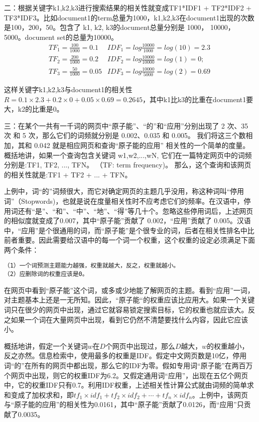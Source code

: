\par 二：根据关键字k1,k2,k3进行搜索结果的相关性就变成TF1*IDF1 + TF2*IDF2 + TF3*IDF3。比如document1的term总量为1000，k1,k2,k3在document1出现的次数是100，200，50。包含了 k1, k2, k3的document总量分别是 1000， 10000，5000。document set的总量为10000。 
\begin{eqnarray*}
TF_1 = \frac{100}{1000} = 0.1 & IDF_1 = log\frac{10000}{1000} = log(10) = 2.3 \\
TF_2 = \frac{200}{1000} = 0.2 & IDF_2 = log\frac{10000}{10000} = log(1) = 0; \\
TF_3 = \frac{50}{1000} = 0.05 & IDF_3 = log\frac{10000}{5000} = log(2) = 0.69
\end{eqnarray*}
\par 这样关键字k1,k2,k3与document1的相关性$R=0.1\times 2.3 + 0.2\times 0 + 0.05\times 0.69 = 0.2645$，其中k1比k3的比重在document1要大，k2的比重是0。
\par 三：在某个一共有一千词的网页中“原子能”、“的”和“应用”分别出现了 2 次、35 次 和 5 次，那么它们的词频就分别是 0.002、0.035 和 0.005。 我们将这三个数相加，其和 0.042 就是相应网页和查询“原子能的应用” 相关性的一个简单的度量。概括地讲，如果一个查询包含关键词 w1,w2,...,wN, 它们在一篇特定网页中的词频分别是:TF1, TF2, ..., TFN。 （TF: term frequency)。 那么，这个查询和该网页的相关性就是:TF1 + TF2 + ... + TFN。
\par 上例中，词“的”词频很大，而它对确定网页的主题几乎没用，称这种词叫“停用词”（Stopwords)，也就是说在度量相关性时不应考虑它们的频率。在汉语中，停用词还有“是”、“和”、“中”、“地”、“得”等几十个。忽略这些停用词后，上述网页的相似度就变成了0.007，其中“原子能”贡献了 0.002，“应用”贡献了 0.005。汉语中，“应用”是个很通用的词，而“原子能”是个很专业的词，后者在相关性排名中比前者重要。因此需要给汉语中的每一个词一个权重，这个权重的设定必须满足下面两个条件：
\begin{verbatim}
（1）一个词预测主题能力越强，权重就越大，反之，权重就越小。
（2）应删除词的权重应该是0。
\end{verbatim}
\par 在网页中看到“原子能”这个词，或多或少地能了解网页的主题。看到“应用”一词，对主题基本上还是一无所知。因此，“原子能“的权重应该比应用大。如果一个关键词只在很少的网页中出现，通过它就容易锁定搜索目标，它的权重也就应该大。反之如果一个词在大量网页中出现，看到它仍然不清楚要找什么内容，因此它应该小。
\par 概括地讲，假定一个关键词$w$在$D$个网页中出现过，那么$D$越大，$w$的权重越小，反之亦然。信息检索中，使用最多的权重是IDF。假定中文网页数是10亿，停用词“的”在所有的网页中都出现，那么它的IDF为零。假如专用词“原子能”在两百万个网页中出现，则它的权重IDF为6.2。又假定通用词“应用”，出现在五亿个网页中，它的权重IDF只有0.7。利用IDF权重，上述相关性计算公式就由词频的简单求和变成了加权求和，即$tf_1\times idf_1+tf_2\times idf_2+ \cdots+tf_n\times idf_n$。上例中，该网页与“原子能的应用”的相关性为0.0161，其中“原子能”贡献了0.0126，而“应用”只贡献了0.0035。
